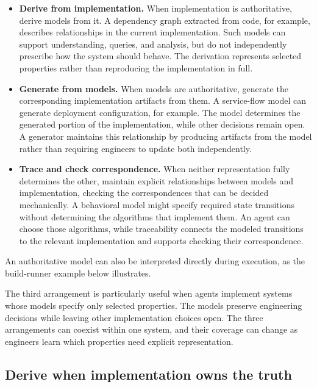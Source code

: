 
\begin{itemize}
\item \textbf{Derive from implementation.} When implementation is authoritative, derive models from it. A dependency graph extracted from code, for example, describes relationships in the current implementation. Such models can support understanding, queries, and analysis, but do not independently prescribe how the system should behave. The derivation represents selected properties rather than reproducing the implementation in full.
\item \textbf{Generate from models.} When models are authoritative, generate the corresponding implementation artifacts from them. A service-flow model can generate deployment configuration, for example. The model determines the generated portion of the implementation, while other decisions remain open. A generator maintains this relationship by producing artifacts from the model rather than requiring engineers to update both independently.
\item \textbf{Trace and check correspondence.} When neither representation fully determines the other, maintain explicit relationships between models and implementation, checking the correspondences that can be decided mechanically. A behavioral model might specify required state transitions without determining the algorithms that implement them. An agent can choose those algorithms, while traceability connects the modeled transitions to the relevant implementation and supports checking their correspondence.
\end{itemize}

An authoritative model can also be interpreted directly during execution, as the build-runner example below illustrates.

The third arrangement is particularly useful when agents implement systems whose models specify only selected properties. The models preserve engineering decisions while leaving other implementation choices open. The three arrangements can coexist within one system, and their coverage can change as engineers learn which properties need explicit representation.



\subsection{Derive when implementation owns the truth}\label{heading:derive-when-implementation-owns-the-truth}

